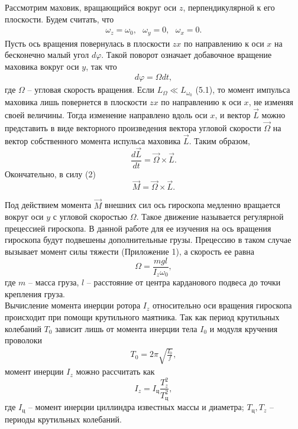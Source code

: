 \documentclass[a4paper]{article}
\begin{document}
\noindent Рассмотрим маховик, вращающийся вокруг оси $z$, перпендикулярной к его плоскости. Будем считать, что
\[
\begin{gathered}
\omega_z = \omega_0, \text{ } \omega_y = 0, \text { } \omega_x = 0.
\end{gathered}
\]
Пусть ось вращения повернулась в плоскости $zx$ по направлению к оси $x$ на бесконечно малый угол $d\varphi$. Такой поворот означает добавочное вращение маховика вокруг оси $y$, так что 
\[
\begin{gathered}
d\varphi = \Omega dt,
\end{gathered}
\]
где $\Omega$ -- угловая скорость вращения. Если $L_\Omega \ll L_{\omega_0}$ (5.1), то момент импульса маховика лишь повернется в плоскости $zx$ по направлению к оси $x$, не изменяя своей величины. Тогда изменение направлено вдоль оси $x$, и вектор $\vec{L}$ можно представить в виде векторного произведения вектора угловой скорости $\vec{\Omega}$ на вектор собственного момента испульса маховика $\vec{L}$. Таким образом, 
\begin{equation}
\frac{d\vec{L}}{dt} = \vec{\Omega} \times \vec{L}.
\end{equation}
Окончательно, в силу (2)
\begin{equation}
\vec{M} = \vec{\Omega} \times \vec{L}.
\end{equation}

\noindent Под действием момента $\vec{M}$ внешних сил ось гироскопа медленно вращается вокруг оси $y$ с угловой скоростью $\Omega$. Такое движение называется регулярной прецессией гироскопа. В данной работе для ее изучения на ось вращения гироскопа будут подвешены дополнительные грузы. Прецессию в таком случае вызывает момент силы тяжести (Приложение 1), а скорость ее равна
\begin{equation}
\Omega = \frac{mgl}{I_z\omega_0},
\end{equation}
где $m$ -- масса груза, $l$ -- расстояние от центра карданового подвеса до точки крепления груза. \vspace{0.25 cm} \\
Вычисление момента инерции ротора $I_z$ относительно оси вращения гироскопа происходит при помощи крутильного маятника. Так как период крутильных колебаний $T_0$ зависит лишь от момента инерции тела $I_0$ и модуля кручения проволоки
\[
\begin{gathered}
T_0 = 2\pi \sqrt{\frac{I_0}{f}},
\end{gathered}
\]
момент инерции $I_z$ можно рассчитать как
\begin{equation}
I_z = I_\text{ц} \frac{T_z^2}{T_\text{ц}^2},
\end{equation}
где $I_\text{ц}$ -- момент инерции циллиндра известных массы и диаметра; $T_\text{ц}, T_z$ -- периоды крутильных колебаний.
\end{document}
